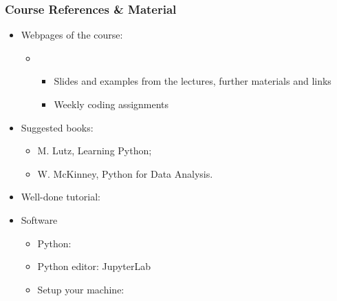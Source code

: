 \begin{frame}
  \frametitle{Course References \& Material}
  \begin{itemize}
  \item Webpages of the course:
	\begin{itemize}
	\item \myurl{\homepage}
  \\ %
  \begin{itemize}
  \item Slides and examples from the lectures, further materials and links
  \item Weekly coding assignments
  \end{itemize}
  \end{itemize}
  \end{itemize}
\begin{itemize}
\item Suggested books: 
\begin{itemize}
	\item M. Lutz, Learning Python; 
	\item W. McKinney, Python for Data Analysis.
	  \end{itemize}
\item Well-done tutorial: 
\item Software
\begin{itemize}
\item Python: 
\item Python editor: JupyterLab  
\item Setup your machine: 
 \myurl{\homepagesetup}
 \end{itemize}
 \end{itemize}
\end{frame}